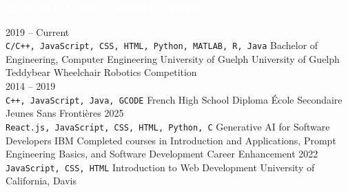 \documentclass[9pt]{src/developercv} %
\begin{document}
\vspace{\baselineskip} %
\colorbox{sky800}{\textcolor{white}{\LARGE\MakeUppercase{\textbf{Education and Certifications}}}}\\%

\begin{entrylist}
	\entry
		{2019 -- Current\\
		\footnotesize{\texttt{C/C++, JavaScript, CSS, HTML, Python, MATLAB, R, Java}}\hfill}
		{Bachelor of Engineering, Computer Engineering}
		{University of Guelph}
		{University of Guelph Teddybear Wheelchair Robotics Competition\hfill\\}
	\entry
		{2014 -- 2019\\
		\footnotesize{\texttt{C++, JavaScript, Java, GCODE}}\hfill}
		{French High School Diploma}
		{École Secondaire Jeunes Sans Frontières}
		{}
	\entry
		{2025\\
		\footnotesize{\texttt{React.js, JavaScript, CSS, HTML, Python, C}}\hfill}
		{Generative AI for Software Developers}
		{IBM}
		{Completed courses in Introduction and Applications, Prompt Engineering Basics, and Software Development Career Enhancement}
	\entry
		{2022\\
		\footnotesize{\texttt{JavaScript, CSS, HTML}}\hfill}
		{Introduction to Web Development}
		{University of California, Davis}
		{}
\end{entrylist}

\end{document}

